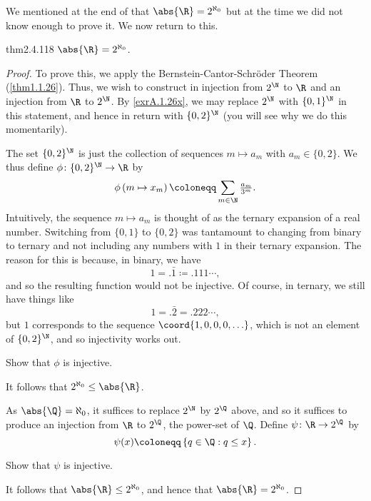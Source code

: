 We mentioned at the end of  that $\abs{\R}=2^{\aleph _0}$ but at the time we did not know enough to prove it.  We now return to this.
\begin{thm}{}{thm2.4.118}
$\abs{\R}=2^{\aleph _0}$.
\begin{proof}
To prove this, we apply the Bernstein-Cantor-Schr\"{o}der Theorem (\cref{thm1.1.26}).  Thus, we wish to construct in injection from $2^{\N}$ to $\R$ and an injection from $\R$ to $2^{\N}$.  By \cref{exrA.1.26x}, we may replace $2^{\N}$ with $\{ 0,1\} ^{\N}$ in this statement, and hence in return with $\{ 0,2\} ^{\N}$ (you will see why we do this momentarily).

The set $\{ 0,2\} ^{\N}$ is just the collection of sequences $m\mapsto a_m$ with $a_m \in \{ 0,2\}$.  We thus define $\phi \colon \{ 0,2\} ^{\N}\rightarrow \R$ by
\begin{equation}
\phi \left( m\mapsto x_m\right) \coloneqq \sum _{m\in \N}\tfrac{a_m}{3^m}.
\end{equation}
Intuitively, the sequence $m\mapsto a_m$ is thought of as the ternary expansion of a real number.   Switching from $\{ 0,1\}$ to $\{ 0,2\}$ was tantamount to changing from binary to ternary and not including any numbers with $1$ in their ternary expansion.  The reason for this is because, in binary, we have
\begin{equation}
1=.\bar{1}\coloneqq .111\cdots ,
\end{equation}
and so the resulting function would not be injective.  Of course, in ternary, we still have things like
\begin{equation}
1=.\bar{2}=.222\cdots ,
\end{equation}
but $1$ corresponds to the sequence $\coord{1,0,0,0,\ldots}$, which is not an element of $\{ 0,2\} ^{\N}$, and so injectivity works out.
\begin{exr}[breakable=false]{}{}
Show that $\phi$ is injective.
\end{exr}
It follows that $2^{\aleph _0}\leq \abs{\R}$.

As $\abs{\Q}=\aleph _0$, it suffices to replace $2^{\N}$ by $2^{\Q}$ above, and so it suffices to produce an injection from $\R$ to $2^{\Q}$, the power-set of $\Q$.  Define $\psi \colon \R \rightarrow 2^{\Q}$ by
\begin{equation}
\psi (x)\coloneqq \left\{ q\in \Q :q\leq x\right\} .
\end{equation}
\begin{exr}[breakable=false]{}{}
Show that $\psi$ is injective.
\end{exr}
It follows that $\abs{\R}\leq 2^{\aleph _0}$, and hence that $\abs{\R}=2^{\aleph _0}$.
\end{proof}
\end{thm}

